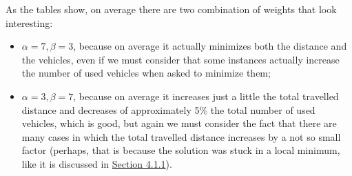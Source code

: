 As the tables show, on average there are two combination of weights that look interesting:
\begin{itemize}
    \item $\alpha=7,\beta=3$, because on average it actually minimizes both the distance and the vehicles, even if we must consider that some instances actually increase the number of used vehicles when asked to minimize them;
    \item $\alpha=3,\beta=7$, because on average it increases just a little the total travelled distance and decreases of approximately 5\% the total number of used vehicles, which is good, but again we must consider the fact that there are many cases in which the total travelled distance increases by a not so small factor (perhaps, that is because the solution was stuck in a local minimum, like it is discussed in \hyperref[subsubsec:failures-unweighted-obj-fun]{Section 4.1.1}).
\end{itemize}